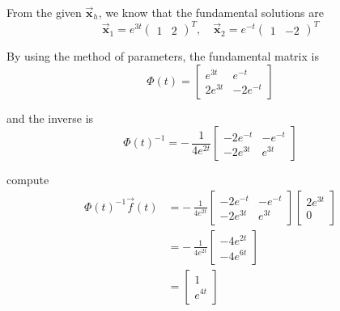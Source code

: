 \begin{solution}
    From the given $\overrightarrow{\mathbf{x}}_h$, we know that the fundamental solutions are 
    \[
        \overrightarrow{\mathbf{x}}_1 = e^{3t} \begin{pmatrix}
            1 & 2
        \end{pmatrix}^T, \quad 
        \overrightarrow{\mathbf{x}}_2 = e^{-t} \begin{pmatrix}
            1 & -2
        \end{pmatrix}^T
    \]
    
    By using the method of parameters, the fundamental matrix is 
    \begin{equation}
        \Phi(t) = \begin{bmatrix}
            e^{3t} & e^{-t}\\ 2e^{3t} & -2e^{-t}
        \end{bmatrix}
    \end{equation}

    and the inverse is
    \begin{equation}
        \Phi(t)^{-1} = -\, \frac{1}{4e^{2t}} \begin{bmatrix}
            -2e^{-t} & -e^{-t}\\ -2e^{3t} & e^{3t}
        \end{bmatrix}
    \end{equation}

    compute 
    \begin{align*}
        \Phi(t)^{-1} \overrightarrow{f}(t) &= -\, \frac{1}{4e^{2t}} \begin{bmatrix}
            -2e^{-t} & -e^{-t}\\ -2e^{3t} & e^{3t}
        \end{bmatrix}
        \begin{bmatrix}
            2e^{3t} \\ 0
        \end{bmatrix} \\
        &= -\, \frac{1}{4e^{2t}} \begin{bmatrix}
            -4e^{2t} \\ -4e^{6t}
        \end{bmatrix} \\
        &= \begin{bmatrix}
            1 \\ e^{4t}
        \end{bmatrix}
    \end{align*}


\end{solution}
